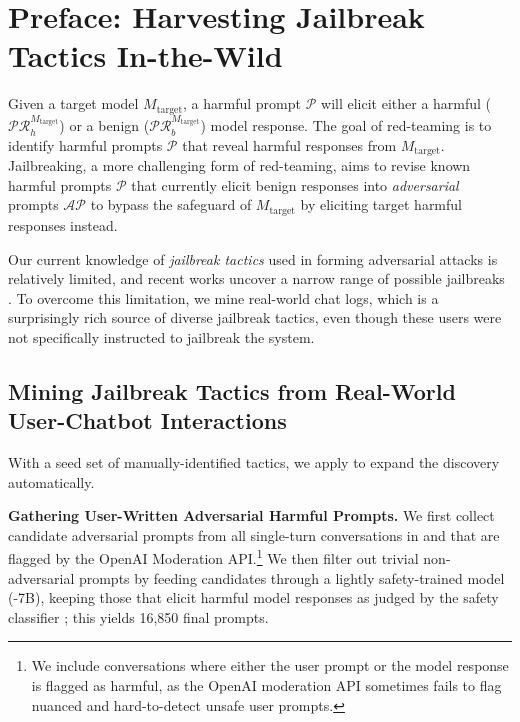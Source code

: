 \section{\method Preface: Harvesting Jailbreak Tactics In-the-Wild}

Given a target model $M_{\text{target}}$, a harmful prompt $\mathcal{P}$ will elicit either a harmful ($\mathcal{P}\mathcal{R}_{h}^{M_{\text{target}}}$) or a benign ($\mathcal{P}\mathcal{R}_{b}^{M_{\text{target}}}$) model response. The goal of red-teaming is to identify harmful prompts $\mathcal{P}$ that reveal harmful responses from $M_{\text{target}}$. Jailbreaking, a more challenging form of red-teaming, aims to revise known harmful prompts $\mathcal{P}$ that currently elicit benign responses into \textit{adversarial} prompts $\mathcal{AP}$ to 
bypass the safeguard of $M_{\text{target}}$ by eliciting target harmful responses instead.

Our current knowledge of \textit{jailbreak tactics} used in forming adversarial attacks is relatively limited, and recent works uncover a narrow range of possible jailbreaks \citep{pap,pair,tap,rainbowteaming}. 
To overcome this limitation, we mine real-world chat logs, which is a surprisingly rich source of diverse jailbreak tactics, even though these users were not specifically instructed to jailbreak the system.



\subsection{Mining Jailbreak Tactics from Real-World User-Chatbot Interactions}

With a seed set of manually-identified tactics, we apply \gptfour to expand the discovery automatically.

\textbf{Gathering \itwshort User-Written Adversarial Harmful Prompts.} 
We first collect candidate adversarial prompts from all single-turn conversations in \lmsysshort \citep{zheng2023lmsyschat1m} and \wildchatshort \citep{zhao2024inthewildchat} that are flagged by the OpenAI Moderation API.\footnote{We include conversations where either the user prompt or the model response is flagged as harmful, as the OpenAI moderation API sometimes fails to flag nuanced and hard-to-detect unsafe user prompts.} We then filter out trivial non-adversarial prompts by feeding candidates through a lightly safety-trained model (\tulu-7B), keeping those that elicit harmful model responses as judged by the \llamaguard safety classifier \citep{llamaguard}; this yields 16,850 final prompts.

